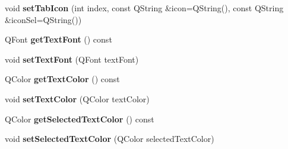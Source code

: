 \begin{DoxyCompactItemize}
void {\bfseries set\+Tab\+Icon} (int index, const Q\+String \&icon=Q\+String(), const Q\+String \&icon\+Sel=Q\+String())
\item 
\mbox{\label{class_q_qt_picture_tab_bar_a901182ffd1fb99aa17daaa4e502aa1f0}} 
Q\+Font {\bfseries get\+Text\+Font} () const
\item 
\mbox{\label{class_q_qt_picture_tab_bar_ac83981a15fe697e4eee95eee83f5292b}} 
void {\bfseries set\+Text\+Font} (Q\+Font text\+Font)
\item 
\mbox{\label{class_q_qt_picture_tab_bar_a49e040f55e491723dd5a5b64835465df}} 
Q\+Color {\bfseries get\+Text\+Color} () const
\item 
\mbox{\label{class_q_qt_picture_tab_bar_a2579ec8ccb9fe1e7408b0fea4577cdb2}} 
void {\bfseries set\+Text\+Color} (Q\+Color text\+Color)
\item 
\mbox{\label{class_q_qt_picture_tab_bar_ae95fdf9ace15dfd9279e8656e6f073b7}} 
Q\+Color {\bfseries get\+Selected\+Text\+Color} () const
\item 
\mbox{\label{class_q_qt_picture_tab_bar_a90f408c8ee7fa4dc29abbaefa646bfd0}} 
void {\bfseries set\+Selected\+Text\+Color} (Q\+Color selected\+Text\+Color)
\end{DoxyCompactItemize}
